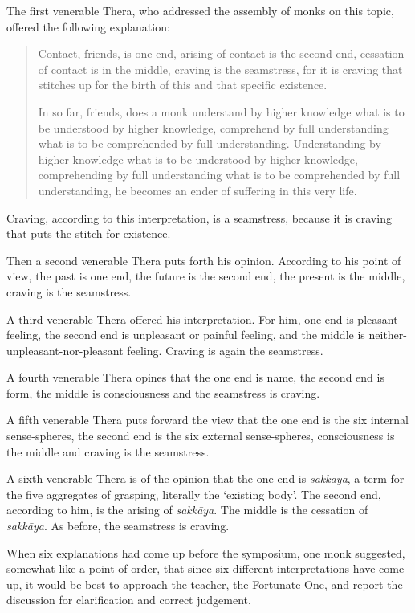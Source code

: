 The first venerable Thera, who addressed the assembly of monks on this topic, offered the following explanation:

\begin{quote}
Contact, friends, is one end, arising of contact is the second end, cessation of contact is in the middle, craving is the seamstress, for it is craving that stitches up for the birth of this and that specific existence.

In so far, friends, does a monk understand by higher knowledge what is to be understood by higher knowledge, comprehend by full understanding what is to be comprehended by full understanding. Understanding by higher knowledge what is to be understood by higher knowledge, comprehending by full understanding what is to be comprehended by full understanding, he becomes an ender of suffering in this very life.
\end{quote}

Craving, according to this interpretation, is a seamstress, because it is craving that puts the stitch for existence.

Then a second venerable Thera puts forth his opinion. According to his point of view, the past is one end, the future is the second end, the present is the middle, craving is the seamstress.

A third venerable Thera offered his interpretation. For him, one end is pleasant feeling, the second end is unpleasant or painful feeling, and the middle is neither-unpleasant-nor-pleasant feeling. Craving is again the seamstress.

A fourth venerable Thera opines that the one end is name, the second end is form, the middle is consciousness and the seamstress is craving.

A fifth venerable Thera puts forward the view that the one end is the six internal sense-spheres, the second end is the six external sense-spheres, consciousness is the middle and craving is the seamstress.

A sixth venerable Thera is of the opinion that the one end is \emph{sakkāya}, a term for the five aggregates of grasping, literally the `existing body'. The second end, according to him, is the arising of \emph{sakkāya}. The middle is the cessation of \emph{sakkāya}. As before, the seamstress is craving.

When six explanations had come up before the symposium, one monk suggested, somewhat like a point of order, that since six different interpretations have come up, it would be best to approach the teacher, the Fortunate One, and report the discussion for clarification and correct judgement.


